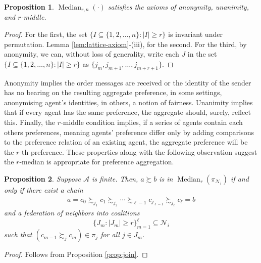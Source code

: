 \documentclass[conference]{ieeeconf}
\newcommand{\N}{\mathcal{N}}
\newcommand{\A}{\mathcal{A}}
\newcommand{\prefers}{\succsim}
\renewcommand{\geq}{\geqslant}
\DeclareMathOperator{\Median}{Median}
\newtheorem{proposition}{Proposition}
\begin{document}
\begin{proposition} \label{prop:median}
    $\Median_{r,n}(\cdot)$ satisfies the axioms of anonymity, unanimity, and $r$-middle.
\end{proposition}
\begin{proof}
    For the first, the set $\{I \subseteq \{1,2,\dots,n\}: |I| \geq r\}$ is invariant under permutation. Lemma \ref{lem:lattice-axiom}-(iii), for the second. For the third, by anonymity, we can, without loss of generality, write each $J$ in the set $\{I \subseteq \{1,2,\dots,n\}: |I| \geq r\}$ as $\{j_m,j_{m+1},\dots,j_{m+r+1}\}$.
\end{proof}

Anonymity implies the order messages are received or the identity of the sender has no bearing on the resulting aggregate preference, in some settings, anonymising agent's identities, in others, a notion of fairness. Unanimity implies that if every agent has the same preference, the aggregate should, surely, reflect this. Finally, the $r$-middle condition implies, if a series of agents contain each others preferences, meaning agents' preference differ only by adding comparisons to the preference relation of an existing agent, the aggregate preference will be the $r$-th preference. These properties along with the following observation suggest the $r$-median is appropriate for preference aggregation.

\begin{proposition} \label{prop:median-chain}
    Suppose $\A$ is finite. Then, $a \prefers b$ is in $\Median_r(\pi_{\N_i})$ if and only if there exist a chain
    \begin{align*}
        a = c_0 \prefers_{j_1} c_1 \prefers_{j_2} \cdots \prefers_{\ell-1} c_{j_{\ell-1}} \prefers_{j_\ell} c_{\ell} = b
    \end{align*}
    and a federation of neighbors into coalitions \[\{ J_m : |J_m| \geq r \}_{m=1}^{\ell} \subseteq \N_i\] such that $(c_{m-1} \prefers_{j} c_{m}) \in \pi_j$ for all  $j \in J_m$.
\end{proposition}
\begin{proof}
    Follows from Proposition \ref{prop:join}.
\end{proof}
\end{document}
